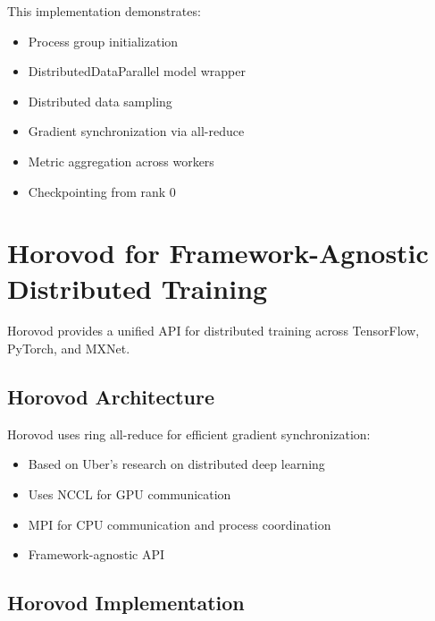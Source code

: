 This implementation demonstrates:
\begin{itemize}
    \item Process group initialization
    \item DistributedDataParallel model wrapper
    \item Distributed data sampling
    \item Gradient synchronization via all-reduce
    \item Metric aggregation across workers
    \item Checkpointing from rank 0
\end{itemize}

\section{Horovod for Framework-Agnostic Distributed Training}

Horovod provides a unified API for distributed training across TensorFlow, PyTorch, and MXNet.

\subsection{Horovod Architecture}

Horovod uses ring all-reduce for efficient gradient synchronization:

\begin{itemize}
    \item Based on Uber's research on distributed deep learning
    \item Uses NCCL for GPU communication
    \item MPI for CPU communication and process coordination
    \item Framework-agnostic API
\end{itemize}

\subsection{Horovod Implementation}

